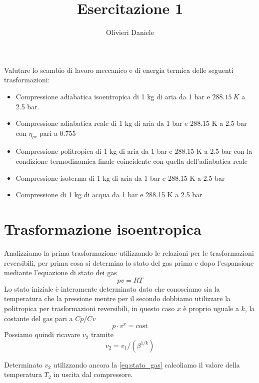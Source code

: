 \documentclass[a4paper,12pt]{article}
\title{Esercitazione 1}
\author{Olivieri Daniele}
\begin{document}
\maketitle
Valutare lo scambio di lavoro meccanico e di energia termica
delle seguenti trasformazioni:
\begin{itemize}
    \item Compressione adiabatica isoentropica di 1 kg di aria da
    1 bar e $288.15\ K$ a 2.5 bar.
    
    \item Compressione adiabatica reale di 1 kg di aria da 1 bar
    e 288.15 K a 2.5 bar con $\eta_{pc}$ pari a 0.755
   
    \item Compressione politropica di 1 kg di aria da 1 bar e 288.15 K a 2.5 bar
    con la condizione termodinamica finale coincidente con quella dell'adiabatica reale
   
    \item Compressione isoterma di 1 kg di aria da 1 bar e 288.15 K a 2.5 bar

    \item Compressione di 1 kg di acqua da 1 bar e 288.15 K a 2.5 bar
\end{itemize}

\section{Trasformazione isoentropica}
\label{sec:prima_trasformazione}
Analizziamo la prima trasformazione utilizzando le relazioni per le trasformazioni reversibili,
per prima cosa si determina lo stato del gas prima e dopo l'espansione mediante l'equazione
di stato dei gas
\begin{equation}
    \label{eq:stato_gas}
    pv = RT
\end{equation}
Lo stato iniziale è interamente determinato dato che conosciamo sia la temperatura che la pressione
mentre per il secondo dobbiamo utilizzare la politropica per trasformazioni reversibili,
in questo caso $x$ è proprio uguale a $k$, la costante del gas pari a $Cp/Cv$
\begin{equation}
    \label{eq:politropica}
    p\cdot v^x=\text{cost}
\end{equation}
Possiamo quindi ricavare $v_2$ tramite $$  v_2 = v_1/(\beta^{1/k}) $$

Determinato $v_2$ utilizzando ancora la \eqref{eq:stato_gas} calcoliamo il valore della temperatura
$T_2$ in uscita dal compressore.
\end{document}
